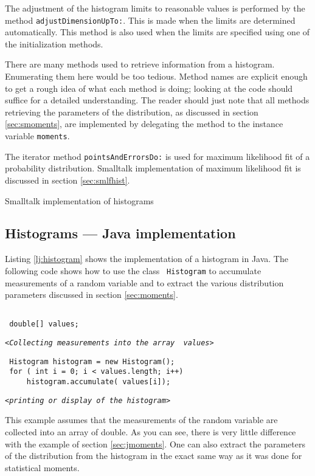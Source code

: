 \documentclass[twoside]{book}
\begin{document}
The adjustment of the histogram limits to reasonable values is
performed by the method {\tt adjustDimensionUpTo:}. This is made
when the limits are determined automatically. This method is also
used when the limits are specified using one of the initialization
methods.

There are many methods used to retrieve information from a
histogram. Enumerating them here would be too tedious. Method
names are explicit enough to get a rough idea of what each method
is doing; looking at the code should suffice for a detailed
understanding. The reader should just note that all methods
retrieving the parameters of the distribution, as discussed in
section \ref{sec:smoments}, are implemented by delegating the
method to the instance variable {\tt moments}.

The iterator method {\tt pointsAndErrorsDo:} is used for maximum
likelihood fit of a probability distribution. Smalltalk
implementation of maximum likelihood fit is discussed in section
\ref{sec:smlfhist}.

\begin{listing} Smalltalk implementation of histograms \label{ls:histogram}

\end{listing}

\subsection{Histograms --- Java implementation} Listing
\ref{lj:histogram} shows the implementation of a histogram in
Java. The following code shows how to use the class {\tt
Histogram} to accumulate measurements of a random variable and to
extract the various distribution parameters discussed in section
\ref{sec:moments}.
\begin{codeExample}
\begin{verbatim}

 double[] values;
\end{verbatim}
\hfil{\tt<\sl Collecting measurements into the array \tt
values>}\hfil
\begin{verbatim}
 Histogram histogram = new Histogram();
 for ( int i = 0; i < values.length; i++)
     histogram.accumulate( values[i]);
\end{verbatim}
\hfil {\tt<\sl printing or display of the histogram\tt >}\hfil
\end{codeExample}
This example assumes that the measurements of the random variable
are collected into an array of double. As you can see, there is
very little difference with the example of section
\ref{sec:jmoments}. One can also extract the parameters of the
distribution from the histogram in the exact same way as it was
done for statistical moments.
\end{document}
